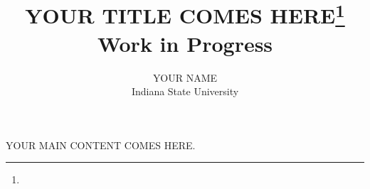 \documentclass{article}
\title{YOUR TITLE COMES HERE\footnote{\protect}\\
\vspace{0.2in}
\large Work in Progress\\}
\author{
YOUR NAME
\\Indiana State University
\\
\email{YOUR EMAIL@indstate.edu}
}
\begin{document}
\maketitle

YOUR MAIN CONTENT COMES HERE.
\end{document}
